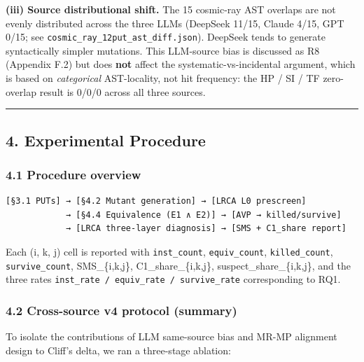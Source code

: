 \documentclass[review,12pt,authoryear]{elsarticle}
\begin{document}
\textbf{(iii) Source distributional shift.} The 15 cosmic-ray AST
overlaps are not evenly distributed across the three LLMs (DeepSeek
11/15, Claude 4/15, GPT 0/15; see
\texttt{cosmic\_ray\_12put\_ast\_diff.json}). DeepSeek tends to generate
syntactically simpler mutations. This LLM-source bias is discussed as R8
(Appendix F.2) but does \textbf{not} affect the systematic-vs-incidental
argument, which is based on \emph{categorical} AST-locality, not hit
frequency: the HP / SI / TF zero-overlap result is 0/0/0 across all
three sources.

\begin{center}\rule{0.5\linewidth}{0.5pt}\end{center}

\subsection{4. Experimental Procedure}\label{experimental-procedure}

\subsubsection{4.1 Procedure overview}\label{procedure-overview}

\begin{verbatim}
[§3.1 PUTs] → [§4.2 Mutant generation] → [LRCA L0 prescreen]
            → [§4.4 Equivalence (E1 ∧ E2)] → [AVP → killed/survive]
            → [LRCA three-layer diagnosis] → [SMS + C1_share report]
\end{verbatim}

Each (i, k, j) cell is reported with \texttt{inst\_count},
\texttt{equiv\_count}, \texttt{killed\_count}, \texttt{survive\_count},
SMS\_\{i,k,j\}, C1\_share\_\{i,k,j\}, suspect\_share\_\{i,k,j\}, and the
three rates \texttt{inst\_rate\ /\ equiv\_rate\ /\ survive\_rate}
corresponding to RQ1.

\subsubsection{4.2 Cross-source v4 protocol
(summary)}\label{cross-source-v4-protocol-summary}

To isolate the contributions of LLM same-source bias and MR-MP alignment
design to Cliff's delta, we ran a three-stage ablation:
\end{document}

